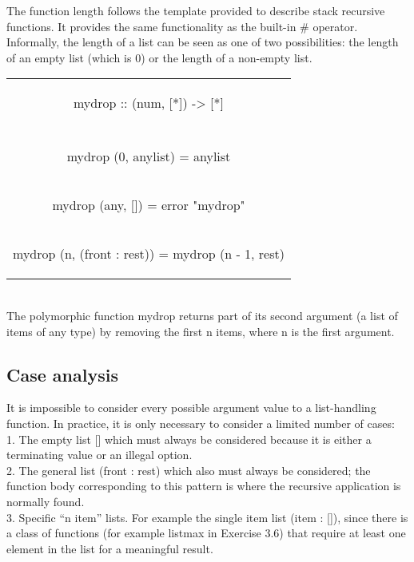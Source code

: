 \documentclass[11pt]{article}
\begin{document}
The function length follows the template provided to describe stack
recursive functions. It provides the same functionality as the built-in # operator.
Informally, the length of a list can be seen as one of two possibilities: the length
of an empty list (which is 0) or the length of a non-empty list.\\

\begin{tabular}{ |c| } 
 \hline
\begin{flushleft} mydrop :: (num, [*]) -> [*] \end{flushleft}\\
\\
\begin{flushleft}mydrop (0, anylist) = anylist\end{flushleft}\\
\begin{flushleft}mydrop (any, []) = error "mydrop"\end{flushleft}\\
\begin{flushleft}mydrop (n, (front : rest)) = mydrop (n - 1, rest)\end{flushleft}\\
\hline
\end{tabular}
\\

The polymorphic function mydrop returns part of its second argument (a list of
items of any type) by removing the first n items, where n is the first argument.

\subsection{Case analysis}

It is impossible to consider every possible argument value to a list-handling function.
In practice, it is only necessary to consider a limited number of cases:\\

1. The empty list [] which must always be considered because it is either a
terminating value or an illegal option.\\

2. The general list (front : rest) which also must always be considered; the
function body corresponding to this pattern is where the recursive application
is normally found.\\

3. Specific “n item” lists. For example the single item list (item : []), since
there is a class of functions (for example listmax in Exercise 3.6) that require
at least one element in the list for a meaningful result.\\
\end{document}

